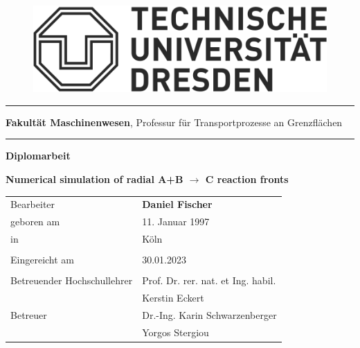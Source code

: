 \documentclass[../thesis.tex]{subfiles}
\begin{document}
\begin{titlepage}
	\begin{addmargin}[22mm]{0mm}
		\begin{figure}[t]
			\hspace*{5mm}\includegraphics[scale=0.35]{figs/Logo.png} \vspace{-8mm}
		\end{figure}
		\rule{140mm}{.4pt}
		\vspace{0.4mm}

		\scriptsize { {\bfseries Fakultät Maschinenwesen},
			Professur für Transportprozesse an Grenzflächen}
		\vspace{-1.4mm}

		\rule{140mm}{.4pt}
		\vspace{2cm}

		{\Large \bfseries Diplomarbeit}
		\vspace{2cm}

		{\LARGE \bfseries Numerical simulation of radial A+B $\rightarrow$ C reaction fronts \par}
		\vspace{2cm}
		\begin{addmargin}[-2mm]{0mm}
			\large
			\begin{tabular}{l l}
			  Bearbeiter                   & {\bfseries Daniel Fischer} \\
			  geboren am                   & 11. Januar 1997 \\
			  in                           & Köln \\ \\
			  Eingereicht am               & 30.01.2023 \\ \\
			  Betreuender Hochschullehrer  & Prof. Dr. rer. nat. et Ing. habil. \\ 
			  							   & Kerstin Eckert \\
			  Betreuer                     & Dr.-Ing. Karin Schwarzenberger  \\
			  							   & Yorgos Stergiou \\

			\end{tabular}
		\end{addmargin}
	\end{addmargin}
\end{titlepage}
\end{document}
